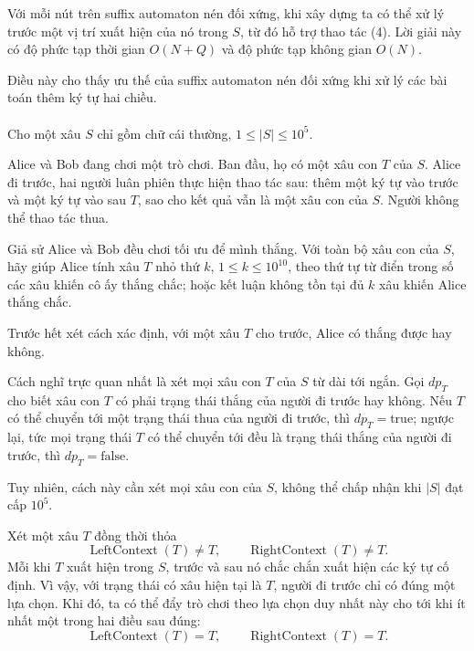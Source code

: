 \documentclass[11pt]{article}
\begin{document}
Với mỗi nút trên suffix automaton nén đối xứng, khi xây dựng ta có thể xử lý
trước một vị trí xuất hiện của nó trong \(S\), từ đó hỗ trợ thao tác (4). Lời
giải này có độ phức tạp thời gian \(O(N+Q)\) và độ phức tạp không gian \(O(N)\).

Điều này cho thấy ưu thế của suffix automaton nén đối xứng khi xử lý các bài
toán thêm ký tự hai chiều.

\paragraph{}
Cho một xâu \(S\) chỉ gồm chữ cái thường, \(1\le |S|\le 10^5\).

Alice và Bob đang chơi một trò chơi. Ban đầu, họ có một xâu con \(T\) của
\(S\). Alice đi trước, hai người luân phiên thực hiện thao tác sau: thêm một ký
tự vào trước và một ký tự vào sau \(T\), sao cho kết quả vẫn là một xâu con của
\(S\). Người không thể thao tác thua.

Giả sử Alice và Bob đều chơi tối ưu để mình thắng. Với toàn bộ xâu con của
\(S\), hãy giúp Alice tính xâu \(T\) nhỏ thứ \(k\), \(1\le k\le 10^{10}\), theo
thứ tự từ điển trong số các xâu khiến cô ấy thắng chắc; hoặc kết luận không tồn
tại đủ \(k\) xâu khiến Alice thắng chắc.

Trước hết xét cách xác định, với một xâu \(T\) cho trước, Alice có thắng được
hay không.

Cách nghĩ trực quan nhất là xét mọi xâu con \(T\) của \(S\) từ dài tới ngắn.
Gọi \(dp_T\) cho biết xâu con \(T\) có phải trạng thái thắng của người đi trước
hay không. Nếu \(T\) có thể chuyển tới một trạng thái thua của người đi trước,
thì \(dp_T=\mathrm{true}\); ngược lại, tức mọi trạng thái \(T\) có thể chuyển
tới đều là trạng thái thắng của người đi trước, thì \(dp_T=\mathrm{false}\).

Tuy nhiên, cách này cần xét mọi xâu con của \(S\), không thể chấp nhận khi
\(|S|\) đạt cấp \(10^5\).

Xét một xâu \(T\) đồng thời thỏa
\[
\operatorname{LeftContext}(T)\ne T,\qquad
\operatorname{RightContext}(T)\ne T.
\]
Mỗi khi \(T\) xuất hiện trong \(S\), trước và sau nó chắc chắn xuất hiện các ký
tự cố định. Vì vậy, với trạng thái có xâu hiện tại là \(T\), người đi trước chỉ
có đúng một lựa chọn. Khi đó, ta có thể đẩy trò chơi theo lựa chọn duy nhất này
cho tới khi ít nhất một trong hai điều sau đúng:
\[
\operatorname{LeftContext}(T)=T,\qquad
\operatorname{RightContext}(T)=T.
\]
\end{document}
